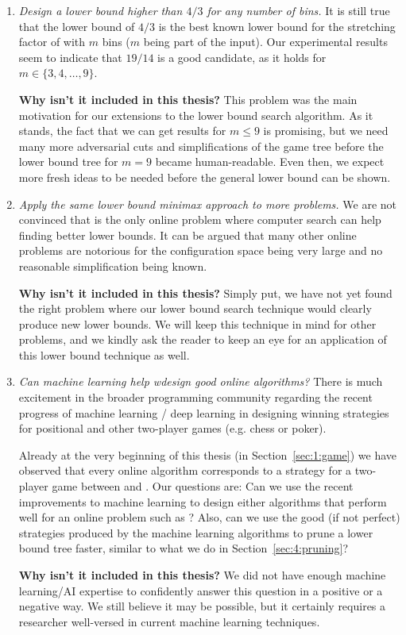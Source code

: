 \begin{enumerate}

\item \textit{Design a lower bound higher than $4/3$ for any number of
bins.} It is still true that the lower bound of $4/3$ is the best
known lower bound for the stretching factor of \binstretch with $m$
bins ($m$ being part of the input). Our experimental results seem to
indicate that $19/14$ is a good candidate, as it holds for $m \in
\{3,4,\ldots,9\}$. 

\noindent\textbf{Why isn't it included in this thesis?} This problem was the
main motivation for our extensions to the lower bound search
algorithm. As it stands, the fact that we can get results for $m \le
9$ is promising, but we need many more adversarial cuts and
simplifications of the game tree before the lower bound tree for $m =
9$ became human-readable. Even then, we expect more fresh ideas to be
needed before the general lower bound can be shown.

\item \textit{Apply the same lower bound minimax approach to more
problems.} We are not convinced that \binstretch is the only online
problem where computer search can help finding better lower bounds.
It can be argued that many other online problems are notorious for the
configuration space being very large and no reasonable simplification
being known.

\noindent\textbf{Why isn't it included in this thesis?} Simply put, we have
not yet found the right problem where our lower bound search technique
would clearly produce new lower bounds. We will keep this technique in
mind for other problems, and we kindly ask the reader to keep an eye
for an application of this lower bound technique as well.

\item \textit{Can machine learning help wdesign good online
algorithms?} There is much excitement in the broader programming
community regarding the recent progress of machine learning / deep
learning in designing winning strategies for positional and other
two-player games (e.g. chess or poker).

Already at the very beginning of this thesis (in
Section~\ref{sec:1:game}) we have observed that every online algorithm
corresponds to a strategy for a two-player game between \algo and
\adversary. Our questions are: Can we use the recent improvements to
machine learning to design either algorithms that perform well for an
online problem such as \binstretch? Also, can we use the good (if not
perfect) strategies produced by the machine learning algorithms to
prune a lower bound tree faster, similar to what we do in
Section~\ref{sec:4:pruning}?

\noindent\textbf{Why isn't it included in this thesis?} We did not
have enough machine learning/AI expertise to confidently answer this
question in a positive or a negative way. We still believe it may be
possible, but it certainly requires a researcher well-versed in
current machine learning techniques.

\end{enumerate}